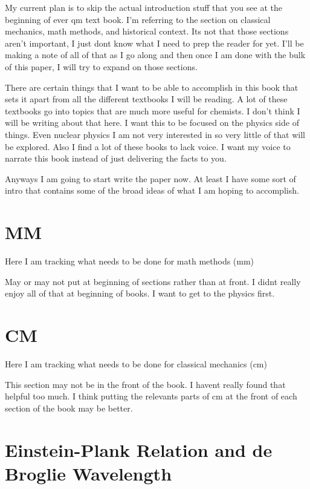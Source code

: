 \documentclass[preprint, review,12pt]{elsarticle}
\begin{document}
My current plan is to skip the actual introduction stuff that you see at the beginning of ever qm text book. I'm referring to the section on classical mechanics, math methods, and historical context. Its not that those sections aren't important, I just dont know what I need to prep the reader for yet. I'll be making a note of all of that as I go along and then once I am done with the bulk of this paper, I will try to expand on those sections. 

There are certain things that I want to be able to accomplish in this book that sets it apart from all the different textbooks I will be reading. A lot of these textbooks go into topics that are much more useful for chemists. I don't think I will be writing about that here. I want this to be focused on the physics side of things. Even nuclear physics I am not very interested in so very little of that will be explored. Also I find a lot of these books to lack voice. I want my voice to narrate this book instead of just delivering the facts to you. 

Anyways I am going to start write the paper now. At least I have some sort of intro that contains some of the broad ideas of what I am hoping to accomplish.

\section{MM}

Here I am tracking what needs to be done for math methods (mm)

May or may not put at beginning of sections rather than at front. I didnt really enjoy all of that at beginning of books. I want to get to the physics first. 

\section{CM}

Here I am tracking what needs to be done for classical mechanics (cm)

This section may not be in the front of the book. I havent really found that helpful too much. I think putting the relevants parts of cm at the front of each section of the book may be better.


\section{Einstein-Plank Relation and de Broglie Wavelength}
\end{document}
